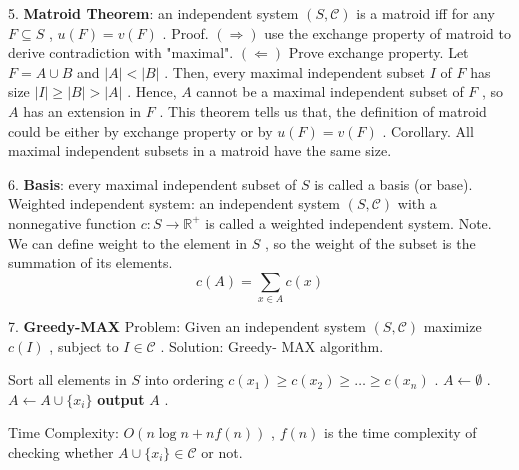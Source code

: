 \documentclass[10pt,a4paper]{article}
\begin{document}
\begin{center}
\end{center}

5. \textbf{Matroid Theorem}: an independent system \((S, \mathcal{C})\) is a matroid iff for any \(F \subseteq S\) , \(u(F) = v(F)\) .
Proof. \((\Rightarrow)\) use the exchange property of matroid to derive contradiction with "maximal".
\((\Leftarrow)\) Prove exchange property. Let \(F = A \cup B\) and \(|A| < |B|\) . Then, every maximal independent subset \(I\) of \(F\) has size \(|I| \geq |B| > |A|\) . Hence, \(A\) cannot be a maximal independent subset of \(F\) , so \(A\) has an extension in \(F\) .
This theorem tells us that, the definition of matroid could be either by exchange property or by \(u(F) = v(F)\) .
Corollary. All maximal independent subsets in a matroid have the same size.

6. \textbf{Basis}: every maximal independent subset of \(S\) is called a basis (or base).
Weighted independent system: an independent system \((S, \mathcal{C})\) with a nonnegative function \(c: S \to \mathbb{R}^{+}\) is called a weighted independent system.
Note. We can define weight to the element in \(S\) , so the weight of the subset is the summation of its elements.
\[
c(A) = \sum_{x\in A}c(x)
\]

7. \textbf{Greedy-MAX}
Problem: Given an independent system \((S, \mathcal{C})\) maximize \(c(I)\) , subject to \(I \in \mathcal{C}\) .
Solution: Greedy- MAX algorithm.

\begin{algorithm}
\caption{Greedy-MAX}
\begin{algorithmic}[1]
\State Sort all elements in \(S\) into ordering \(c(x_{1}) \geq c(x_{2}) \geq \dots \geq c(x_{n})\) .
\State \(A\leftarrow \emptyset\) .
        \State \(A \leftarrow A \cup \{x_{i}\}\)
    \EndIf
\EndFor
\State \textbf{output} \(A\) .
\end{algorithmic}
\end{algorithm}

Time Complexity: \(O(n \log n + n f(n))\) , \(f(n)\) is the time complexity of checking whether \(A \cup \{x_{i}\} \in \mathcal{C}\) or not.
\end{document}
